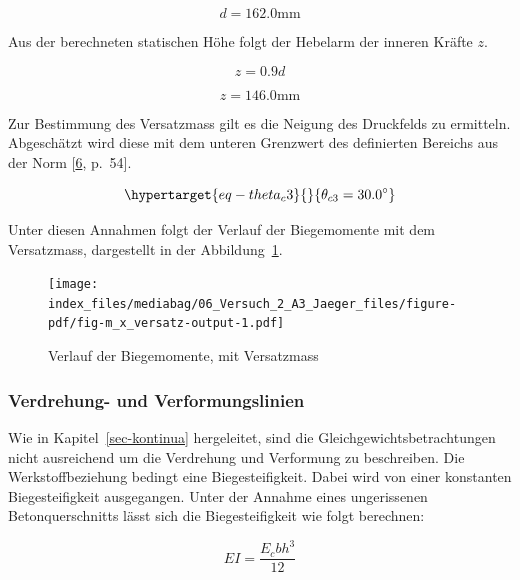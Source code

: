 \documentclass[
  12pt,
  letterpaper,
  egregdoesnotlikesansseriftitles]{scrreprt}
\begin{document}
\begin{equation}d = 162.0 \text{mm}\end{equation}

Aus der berechneten statischen Höhe folgt der Hebelarm der inneren
Kräfte \(z\).

\begin{equation}z = 0.9 d\end{equation}

\begin{equation}z = 146.0 \text{mm}\end{equation}

Zur Bestimmung des Versatzmass gilt es die Neigung des Druckfelds zu
ermitteln. Abgeschätzt wird diese mit dem unteren Grenzwert des
definierten Bereichs aus der Norm
{[}\protect\hyperlink{ref-SIA2013a}{6}, p.~54{]}.

\begin{equation}\protect\hypertarget{eq-theta_c3}{}{
 \theta_{c3} = 30.0^{\circ} 
}\label{eq-theta_c3}\end{equation}

Unter diesen Annahmen folgt der Verlauf der Biegemomente mit dem
Versatzmass, dargestellt in der Abbildung~\ref{fig-m_x_versatz}.

\begin{figure}[H]

{\centering \texttt{[image: index\_files/mediabag/06\_Versuch\_2\_A3\_Jaeger\_files/figure-pdf/fig-m\_x\_versatz-output-1.pdf]}

}

\caption{\label{fig-m_x_versatz}Verlauf der Biegemomente, mit
Versatzmass}

\end{figure}

\hypertarget{verdrehung--und-verformungslinien}{%
\subsubsection{Verdrehung- und
Verformungslinien}\label{verdrehung--und-verformungslinien}}

Wie in Kapitel~\ref{sec-kontinua} hergeleitet, sind die
Gleichgewichtsbetrachtungen nicht ausreichend um die Verdrehung und
Verformung zu beschreiben. Die Werkstoffbeziehung bedingt eine
Biegesteifigkeit. Dabei wird von einer konstanten Biegesteifigkeit
ausgegangen. Unter der Annahme eines ungerissenen Betonquerschnitts
lässt sich die Biegesteifigkeit wie folgt berechnen:

\begin{equation}EI = \frac{E_{c} b h^{3}}{12}\end{equation}
\end{document}
